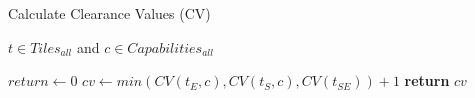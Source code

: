 \begin{algorithm}
\caption{Calculate Clearance Values (CV)}
\label{aha-alg:calculateclearance}
\begin{algorithmic}
\REQUIRE $t \in Tiles_{all}$ and $c \in Capabilities_{all}$

	 \STATE $return \leftarrow 0$  \ENDIF
	\STATE $cv \leftarrow min(CV(t_{E}, c), CV(t_{S}, c), CV(t_{SE})) + 1$
	\STATE \textbf{return} $cv$
\end{algorithmic}
\end{algorithm}
